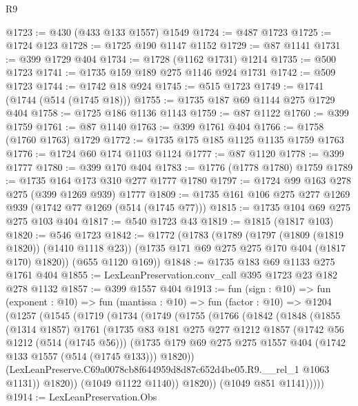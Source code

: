 \begin{lexlean}{R9}
\begin{coremodule}
@1723 := @430 (@433 @133 @1557) @1549
@1724 := @487 @1723
@1725 := @1724 @123
@1728 := @1725 @190 @1147 @1152
@1729 := @87 @1141
@1731 := @399 @1729 @404
@1734 := @1728 (@1162 @1731) @1214
@1735 := @500 @1723
@1741 := @1735 @159 @189 @275 @1146 @924 @1731
@1742 := @509 @1723
@1744 := @1742 @18 @924
@1745 := @515 @1723
@1749 := @1741 (@1744 (@514 (@1745 @18)))
@1755 := @1735 @187 @69 @1144 @275 @1729 @404
@1758 := @1725 @186 @1136 @1143
@1759 := @87 @1122
@1760 := @399 @1759
@1761 := @87 @1140
@1763 := @399 @1761 @404
@1766 := @1758 (@1760 @1763) @1729
@1772 := @1735 @175 @185 @1125 @1135 @1759 @1763
@1776 := @1724 @60 @174 @1103 @1124
@1777 := @87 @1120
@1778 := @399 @1777
@1780 := @399 @170 @404
@1783 := @1776 (@1778 @1780) @1759
@1789 := @1735 @164 @173 @310 @277 @1777 @1780
@1797 := @1724 @99 @163 @278 @275 (@399 @1269 @939) @1777
@1809 := @1735 @161 @106 @275 @277 @1269 @939 (@1742 @77 @1269 (@514 (@1745 @77)))
@1815 := @1735 @104 @69 @275 @275 @103 @404
@1817 := @540 @1723 @43
@1819 := @1815 (@1817 @103)
@1820 := @546 @1723
@1842 := @1772
    (@1783
      (@1789
        (@1797 (@1809 (@1819 @1820)) (@1410 @1118 @23))
        (@1735 @171 @69 @275 @275 @170 @404 (@1817 @170) @1820))
      (@655 @1120 @169))
@1848 := @1735 @183 @69 @1133 @275 @1761 @404
@1855 := LexLeanPreservation.conv_call @395 @1723 @23 @182 @278 @1132
@1857 := @399 @1557 @404
@1913 := fun (sign : @10) =>
  fun (exponent : @10) =>
  fun (mantissa : @10) =>
  fun (factor : @10) =>
  @1204
    (@1257
      (@1545
        (@1719
          (@1734
            (@1749
              (@1755
                (@1766
                  (@1842
                    (@1848
                      (@1855
                        (@1314 @1857)
                        @1761
                        (@1735
                          @83
                          @181
                          @275
                          @277
                          @1212
                          @1857
                          (@1742 @56 @1212 (@514 (@1745 @56)))
                          (@1735
                            @179
                            @69
                            @275
                            @275
                            @1557
                            @404
                            (@1742 @133 @1557 (@514 (@1745 @133)))
                            @1820))
                        (LexLeanPreserve.C69a0078cb8f644959d8d87c652d4be05.R9.__rel_1 @1063 @1131))
                      @1820))
                  (@1049 @1122 @1140))
                @1820))
            (@1049 @851 @1141)))))
@1914 := LexLeanPreservation.Obs

\end{coremodule}
\end{lexlean}
